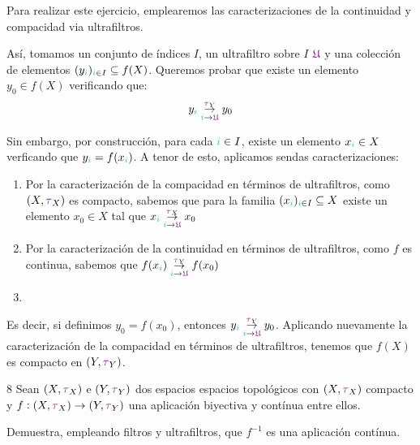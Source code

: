 \documentclass[titlepage,11pt,a4paper]{book}
\newcommand{\ultf}{\ensuremath{\textcolor{Plum}{\mathfrak{U}}}}
\newcommand{\ii}{\ensuremath{\textcolor{TealBlue}{i}}}
\newcommand{\taut}{\textcolor{Fuchsia}{\tau}}
\begin{document}
    \begin{resol}
    Para realizar este ejercicio, emplearemos las caracterizaciones de la continuidad y compacidad via ultrafiltros. 
    
    \medskip
    Así, tomamos un conjunto de índices $I$, un ultrafiltro sobre $I$ $\ultf$ y una colección de elementos $(y_{\ii})_{\ii \in I} \subseteq f(X)$. Queremos probar que existe un elemento $y_{0} \in f(X)$ verificando que:
    \[
    y_{\ii} \underset{\ii \to \ultf}{\overset{\taut_{Y}}{\to}} y_{0}
    \]

    \smallskip
    Sin embargo, por construcción, para cada $\ii \in I$, existe un elemento $x_{\ii} \in X$ verficando que $y_{\ii} = f(x_{\ii})$. A tenor de esto, aplicamos sendas caracterizaciones:
    \begin{enumerate}
        \item[(1)] Por la caracterización de la compacidad en términos de ultrafiltros, como $(X,\taut_{X})$ es compacto, sabemos que para la familia $(x_{\ii})_{\ii \in I} \subseteq X$ existe un elemento $x_{0} \in X$ tal que $x_{\ii} \underset{\ii \to \ultf}{\overset{\taut_{X}}{\to}} x_{0}$
        \item[(2)] Por la caracterización de la continuidad en términos de ultrafiltros, como $f$ es continua, sabemos que $f(x_{\ii}) \underset{\ii \to \ultf}{\overset{\taut_{Y}}{\to}} f(x_{0})$
        \item[] 
    \end{enumerate}

    Es decir, si definimos $y_{0} = f(x_{0})$, entonces $y_{\ii} \underset{\ii \to \ultf}{\overset{\taut_{Y}}{\to}} y_{0}$. Aplicando nuevamente la caracterización de la compacidad en términos de ultrafiltros, tenemos que $f(X)$ es compacto en $(Y,\taut_{Y})$. 
    \end{resol}

    \begin{ejer*}{8}
       Sean $(X, \taut_{X})$ e $(Y,\taut_{Y})$ dos espacios espacios topológicos con $(X, \taut_{X})$ compacto y $f : (X,\taut_{X}) \to (Y,\taut_{Y})$ una aplicación biyectiva y contínua entre ellos.

        \smallskip
        Demuestra, empleando filtros y ultrafiltros, que $f^{-1}$ es una aplicación contínua.
        
    \end{ejer*}
\end{document}
